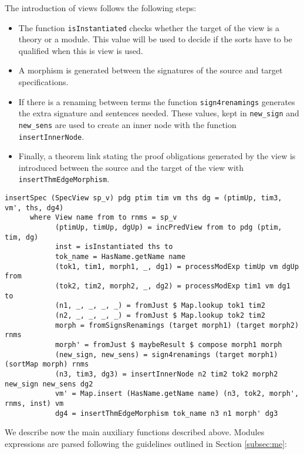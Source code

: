 The introduction of views follows the following steps:

\begin{itemize}
\item The function \verb"isInstantiated" checks whether the target of the
view is a theory or a module. This value will be used to decide if the
sorts have to be qualified when this is view is used.
\item A morphism is generated between the signatures of the source and
target specifications.
\item If there is a renaming between terms the function \verb"sign4renamings"
generates the extra signature and sentences needed. These values, kept in
\verb"new_sign" and \verb"new_sens" are used to create an inner node with
the function \verb"insertInnerNode".
\item Finally, a theorem link stating the proof obligations generated by
the view is introduced between the source and the target of the view with
\verb"insertThmEdgeMorphism".
\end{itemize}

{\codesize
\begin{verbatim}
insertSpec (SpecView sp_v) pdg ptim tim vm ths dg = (ptimUp, tim3, vm', ths, dg4)
      where View name from to rnms = sp_v
            (ptimUp, timUp, dgUp) = incPredView from to pdg (ptim, tim, dg)
            inst = isInstantiated ths to
            tok_name = HasName.getName name
            (tok1, tim1, morph1, _, dg1) = processModExp timUp vm dgUp from
            (tok2, tim2, morph2, _, dg2) = processModExp tim1 vm dg1 to
            (n1, _, _, _, _) = fromJust $ Map.lookup tok1 tim2
            (n2, _, _, _, _) = fromJust $ Map.lookup tok2 tim2
            morph = fromSignsRenamings (target morph1) (target morph2) rnms
            morph' = fromJust $ maybeResult $ compose morph1 morph
            (new_sign, new_sens) = sign4renamings (target morph1) (sortMap morph) rnms
            (n3, tim3, dg3) = insertInnerNode n2 tim2 tok2 morph2 new_sign new_sens dg2
            vm' = Map.insert (HasName.getName name) (n3, tok2, morph', rnms, inst) vm
            dg4 = insertThmEdgeMorphism tok_name n3 n1 morph' dg3
\end{verbatim}
}

We describe now the main auxiliary functions described above.
Modules expressions are parsed following the guidelines outlined in
Section \ref{subsec:me}:

